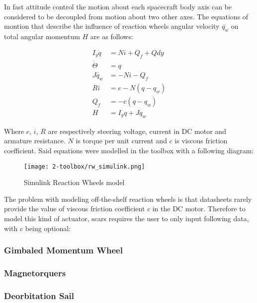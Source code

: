         In fast attitude control the motion about each spacecraft body axis can be considered to be decoupled from motion about two other axes. The equations of montion that describe the influence of reaction wheels angular velocity $\dot{q_w}$ on total angular momentum $H$ are as follows:
        
        \begin{align}
            I_y\dot{q} &= Ni+Q_f+Qdy\\
            \dot{\Theta} &= q\\
            J\dot{q_w} &= -Ni-Q_f\\
            Ri &= e - N(q-q_w)\\
            Q_f &= -c(q-q_w)\\
            H &= I_yq + Jq_w
        \end{align}

        Where $e$, $i$, $R$ are respectively steering voltage, current in DC motor and armature resistance. $N$ is torque per unit current and $c$ is viscous friction coefficient. Said equations were modelled in the toolbox with a following diagram: 
        
        \begin{figure}[hb]
            \centering
            \texttt{[image: 2-toolbox/rw\_simulink.png]}
            \caption{Simulink Reaction Wheels model}
            \label{fig:rw_simulink}
        \end{figure}

        The problem with modeling off-the-shelf reaction wheels is that datasheets rarely provide the value of viscous friction coefficient $c$ in the DC motor. Therefore to model this kind of actuator, \ac{scars} requires the user to only input following data, with $c$ being optional:

        
        \subsubsection{Gimbaled Momentum Wheel}



    \subsubsection{Magnetorquers}


    \subsubsection{Deorbitation Sail}


